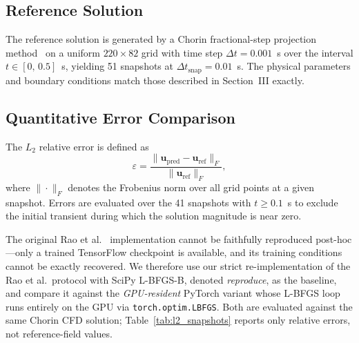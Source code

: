 
\subsection{Reference Solution}

The reference solution is generated by a Chorin fractional-step
projection method~\cite{chorin1968projection} on a
uniform $220\times82$ grid with time step $\Delta t = 0.001$~s over the
interval $t\in[0,\,0.5]$~s, yielding 51 snapshots at $\Delta t_\text{snap}
= 0.01$~s.  The physical parameters and boundary conditions match those
described in Section~III exactly.

\subsection{Quantitative Error Comparison}

The $L_2$ relative error is defined as
\begin{equation}
  \varepsilon = \frac{\|\mathbf{u}_\text{pred} - \mathbf{u}_\text{ref}\|_F}
                     {\|\mathbf{u}_\text{ref}\|_F},
  \label{eq:l2rel}
\end{equation}
where $\|\cdot\|_F$ denotes the Frobenius norm over all grid points at a
given snapshot.  Errors are evaluated over the 41 snapshots with
$t\geq0.1$~s to exclude the initial transient during which the solution
magnitude is near zero.

The original Rao et al.~\cite{rao2020pinnflow} implementation cannot be
faithfully reproduced post-hoc---only a trained TensorFlow checkpoint is
available, and its training conditions cannot be exactly recovered.  We
therefore use our strict re-implementation of the Rao et al.\ protocol
with SciPy L-BFGS-B, denoted \emph{reproduce}, as the baseline, and
compare it against the \emph{GPU-resident} PyTorch variant whose L-BFGS
loop runs entirely on the GPU via \texttt{torch.optim.LBFGS}.  Both are
evaluated against the same Chorin CFD solution;
Table~\ref{tab:l2_snapshots} reports only relative errors, not
reference-field values.

